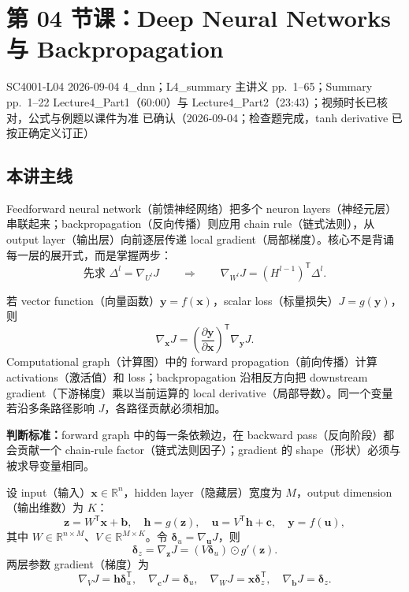 
\section{第 04 节课：Deep Neural Networks 与 Backpropagation}
\label{lecture:SC4001-L04}

\lecturemeta
  {SC4001-L04}
  {2026-09-04}
  {4\_dnn；L4\_summary}
  {主讲义 pp.~1--65；Summary pp.~1--22}
  {Lecture4\_Part1（60:00）与 Lecture4\_Part2（23:43）；视频时长已核对，公式与例题以课件为准}
  {已确认（2026-09-04；检查题完成，tanh derivative 已按正确定义订正）}

\subsection{本讲主线}

Feedforward neural network（前馈神经网络）把多个 neuron layers（神经元层）串联起来；backpropagation（反向传播）则应用 chain rule（链式法则），从 output layer（输出层）向前逐层传递 local gradient（局部梯度）。核心不是背诵每一层的展开式，而是掌握两步：
\[
  \boxed{\text{先求 }\Delta^l=\nabla_{U^l}J}
  \qquad\Longrightarrow\qquad
  \boxed{\nabla_{W^l}J=(H^{l-1})^{\mathsf T}\Delta^l}.
\]


若 vector function（向量函数）$\bm y=f(\bm x)$，scalar loss（标量损失）$J=g(\bm y)$，则
\[
  \boxed{\nabla_{\bm x}J
    =\left(\frac{\partial\bm y}{\partial\bm x}\right)^{\mathsf T}
      \nabla_{\bm y}J}.
\]
Computational graph（计算图）中的 forward propagation（前向传播）计算 activations（激活值）和 loss；backpropagation 沿相反方向把 downstream gradient（下游梯度）乘以当前运算的 local derivative（局部导数）。同一个变量若沿多条路径影响 $J$，各路径贡献必须相加。

\textbf{判断标准：}forward graph 中的每一条依赖边，在 backward pass（反向阶段）都会贡献一个 chain-rule factor（链式法则因子）；gradient 的 shape（形状）必须与被求导变量相同。


设 input（输入）$\bm x\in\mathbb R^n$，hidden layer（隐藏层）宽度为 $M$，output dimension（输出维数）为 $K$：
\[
  \bm z=W^{\mathsf T}\bm x+\bm b,
  \quad \bm h=g(\bm z),
  \quad \bm u=V^{\mathsf T}\bm h+\bm c,
  \quad \bm y=f(\bm u),
\]
其中 $W\in\mathbb R^{n\times M}$、$V\in\mathbb R^{M\times K}$。令 $\bm\delta_u=\nabla_{\bm u}J$，则
\[
  \boxed{\bm\delta_z
  =\nabla_{\bm z}J
  =(V\bm\delta_u)\odot g'(\bm z)}.
\]
两层参数 gradient（梯度）为
\[
  \boxed{\nabla_VJ=\bm h\bm\delta_u^{\mathsf T}},
  \quad \boxed{\nabla_{\bm c}J=\bm\delta_u},
  \quad \boxed{\nabla_WJ=\bm x\bm\delta_z^{\mathsf T}},
  \quad \boxed{\nabla_{\bm b}J=\bm\delta_z}.
\]

